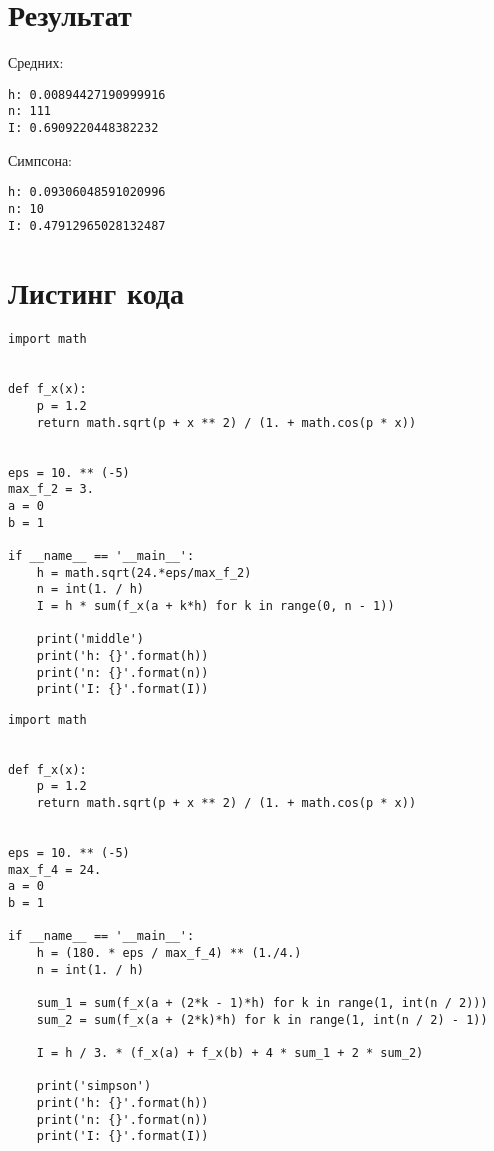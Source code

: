 \documentclass[12pt]{article}
\makeatletter
\newcommand{\verbatimfont}[1]{\renewcommand{\verbatim@font}{\ttfamily#1}}
\makeatother
\begin{document}
\section{Результат}
Средних:
\verbatimfont{\small}
\begin{verbatim}
h: 0.00894427190999916
n: 111
I: 0.6909220448382232
\end{verbatim}
Симпсона:
\verbatimfont{\small}
\begin{verbatim}
h: 0.09306048591020996
n: 10
I: 0.47912965028132487
\end{verbatim}
\newpage
\section{Листинг кода}
\verbatimfont{\small}
\begin{verbatim}
import math


def f_x(x):
    p = 1.2
    return math.sqrt(p + x ** 2) / (1. + math.cos(p * x))


eps = 10. ** (-5)
max_f_2 = 3.
a = 0
b = 1

if __name__ == '__main__':
    h = math.sqrt(24.*eps/max_f_2)
    n = int(1. / h)
    I = h * sum(f_x(a + k*h) for k in range(0, n - 1))

    print('middle')
    print('h: {}'.format(h))
    print('n: {}'.format(n))
    print('I: {}'.format(I))
\end{verbatim}
\newpage
\verbatimfont{\small}
\begin{verbatim}
import math


def f_x(x):
    p = 1.2
    return math.sqrt(p + x ** 2) / (1. + math.cos(p * x))


eps = 10. ** (-5)
max_f_4 = 24.
a = 0
b = 1

if __name__ == '__main__':
    h = (180. * eps / max_f_4) ** (1./4.)
    n = int(1. / h)

    sum_1 = sum(f_x(a + (2*k - 1)*h) for k in range(1, int(n / 2)))
    sum_2 = sum(f_x(a + (2*k)*h) for k in range(1, int(n / 2) - 1))

    I = h / 3. * (f_x(a) + f_x(b) + 4 * sum_1 + 2 * sum_2)

    print('simpson')
    print('h: {}'.format(h))
    print('n: {}'.format(n))
    print('I: {}'.format(I))
\end{verbatim}
\end{document}
